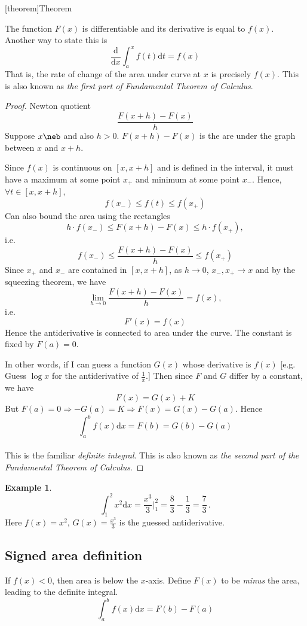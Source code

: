 \documentclass[12pt]{report}
\theoremstyle{definition}
\begin{document}
[theorem]{Theorem}
\begin{1st part of FTC}
    The function $F(x)$ is differentiable and its derivative is equal to $f(x)$.
    Another way to state this is \[
        \frac{\mathrm{d}}{\mathrm{d}x} \int_a^x {f(t)} \mathrm{d}t = f(x)
    \]That is, the rate of change of the area under curve at $x$ is precisely $f(x)$.
    This is also known as \emph{the first part of Fundamental Theorem of Calculus}.
\end{1st part of FTC}
\begin{proof}
    Newton quotient
    \[
        \frac{F(x+h)-F(x)}{h}
    \]
    Suppose $x\neb$ and also $h>0$.
    $F(x+h)-F(x)$ is the are under the graph between $x$ and $x+h$.

    Since $f(x)$ is continuous on $[x,x+h]$ and is defined in the interval, it must have a maximum at some point $x_+$
    and minimum at some point $x_-$. Hence, $\forall t\in[x,x+h]$, 
    \[
        f(x_-) \le f(t) \le f(x_+)
    \]
    Can also bound the area using the rectangles
    \[
        h\cdot f(x_-) \le F(x+h)-F(x) \le h\cdot f(x_+)
    ,\] i.e.
    \[
        f(x_-) \le \frac{F(x+h)-F(x)}{h} \le f(x_+)
    \]
    Since $x_+$ and $x_-$ are contained in $[x,x+h]$, as $h \to 0$, $x_-, x_+ \to x$ and by the squeezing theorem,
    we have \[
        \lim_{h \to 0} \frac{F(x+h)-F(x)}{h} = f(x)
    ,\] i.e. \[
      F'(x) = f(x)
    \]
    Hence the antiderivative is connected to area under the curve. The constant is fixed by $F(a) = 0$.

    In other words, if I can guess a function $G(x)$ whose derivative is $f(x)$ 
    [e.g. Guess $\log{x}$ for the antiderivative of $\frac{1}{x}$.]
    Then since $F$ and $G$ differ by a constant, we have \[
        F(x) = G(x) + K
    \]
    But $F(a)=0 \Rightarrow -G(a) = K \Rightarrow F(x) = G(x) - G(a)$.
    Hence \[
        \int_a^b f(x)\mathrm{d}x = F(b) = G(b) - G(a)
    \]
    \\This is the familiar \emph{definite integral}.
    This is also known as \emph{the second part of the Fundamental Theorem of Calculus}.
\end{proof}
\newtheorem{ex}[theorem]{Example}
\begin{ex}
    \[
        \int_1^2 x^2\mathrm{d}x = \frac{x^3}{3} \Big|_1^2 = \frac{8}{3} - \frac{1}{3} = \frac{7}{3}
    \,.\]
    Here $f(x) = x^2$, $G(x) = \frac{x^3}{3}$ is the guessed antiderivative.
\end{ex}
\subsection{Signed area definition}
If $f(x)<0$, then area is below the $x$-axis. Define $F(x)$ to be \emph{minus} the area, leading to the definite integral.
\[
    \int_a^b f(x)\mathrm{d}x = F(b) - F(a)
\]
\end{document}
